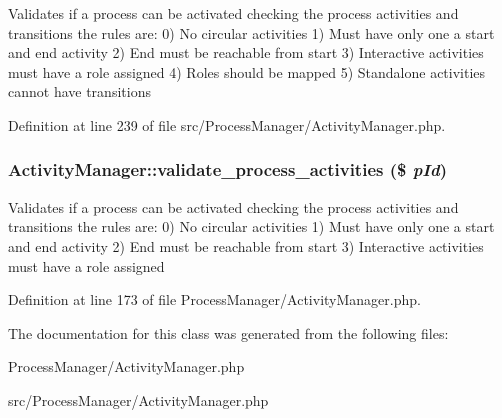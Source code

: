 Validates if a process can be activated checking the process activities and transitions the rules are: 0) No circular activities 1) Must have only one a start and end activity 2) End must be reachable from start 3) Interactive activities must have a role assigned 4) Roles should be mapped 5) Standalone activities cannot have transitions 

Definition at line 239 of file src/Process\-Manager/Activity\-Manager.php.
\subsubsection{\setlength{\rightskip}{0pt plus 5cm}Activity\-Manager::validate\_\-process\_\-activities (\$ {\em p\-Id})}\label{classActivityManager_a10}


Validates if a process can be activated checking the process activities and transitions the rules are: 0) No circular activities 1) Must have only one a start and end activity 2) End must be reachable from start 3) Interactive activities must have a role assigned 

Definition at line 173 of file Process\-Manager/Activity\-Manager.php.

The documentation for this class was generated from the following files:\begin{CompactItemize}
\item 
Process\-Manager/Activity\-Manager.php\item 
src/Process\-Manager/Activity\-Manager.php\end{CompactItemize}
